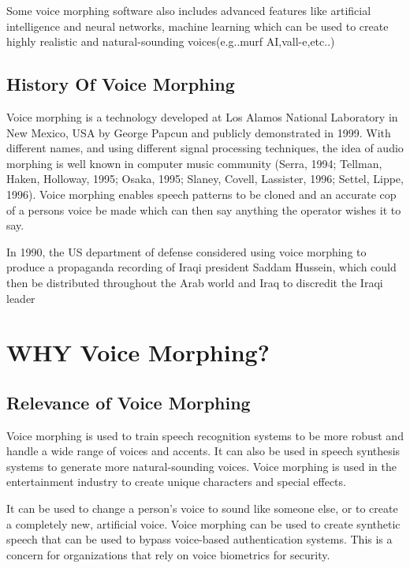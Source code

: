 \documentclass[12pt]{report}
\begin{document}
Some voice morphing software also includes advanced features like artificial intelligence and neural networks, machine learning which can be used to create highly realistic and natural-sounding voices(e.g..murf AI,vall-e,etc..)
\section{History Of  Voice Morphing}
Voice morphing is a technology developed at Los Alamos National Laboratory in New Mexico, USA by George Papcun and publicly demonstrated in 1999. With different names, and using different signal processing techniques, the idea of audio morphing is well known in computer music community (Serra, 1994; Tellman, Haken, Holloway, 1995; Osaka, 1995; Slaney, Covell, Lassister, 1996; Settel, Lippe, 1996). Voice morphing enables speech patterns to be cloned and an accurate cop of a persons voice be made which can then say anything the operator wishes it to say. 
\newline

In 1990, the US department of defense considered 
using voice morphing to produce a propaganda 
recording of Iraqi president Saddam Hussein, which 
could then be distributed throughout the Arab world 
and Iraq to discredit the Iraqi leader


\chapter{WHY Voice Morphing?} %

\section{Relevance of Voice Morphing}
Voice morphing is used to train speech recognition systems to be more robust and handle a wide range of 
voices and accents. It can also be used in speech synthesis systems to generate more natural-sounding 
voices. Voice morphing is used in the entertainment industry to create unique characters and special 
effects.
\newline

It can be used to change a person's voice to sound like someone else, or to create a completely 
new, artificial voice. Voice morphing can be used to create synthetic speech that can be used to bypass 
voice-based authentication systems. This is a concern for organizations that rely on voice biometrics for 
security.
\newline
\end{document}
